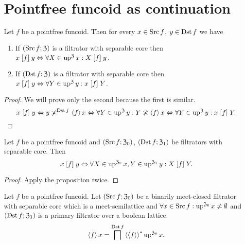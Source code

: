 \section{Pointfree funcoid as continuation}
\begin{prop}
Let $f$ be a pointfree funcoid. Then for every $x\in\operatorname{Src} f$, $y\in\operatorname{Dst} f$
we have
\begin{enumerate}
\item If $(\operatorname{Src} f;\mathfrak{Z})$ is a filtrator with separable core then
$x\mathrel{\left[f\right]}y\Leftrightarrow\forall X\in\operatorname{up}^{\mathfrak{Z}}x:X\mathrel{\left[f\right]}y$.
\item If $(\operatorname{Dst} f;\mathfrak{Z})$ is a filtrator with separable core then
$x\mathrel{\left[f\right]}y\Leftrightarrow\forall Y\in\operatorname{up}^{\mathfrak{Z}}y:x\mathrel{\left[f\right]}Y$.
\end{enumerate}
\end{prop}
\begin{proof}
We will prove only the second because the first is similar.
\[
x\mathrel{\left[f\right]}y\Leftrightarrow y\not\asymp^{\operatorname{Dst} f}\left\langle f\right\rangle x\Leftrightarrow\forall Y\in\operatorname{up}^{\mathfrak{Z}}y:Y\not\asymp\left\langle f\right\rangle x\Leftrightarrow\forall Y\in\operatorname{up}^{\mathfrak{Z}}y:x\mathrel{\left[f\right]}Y.
\]
\end{proof}
\begin{cor}
\label{pf-relatom-both}Let $f$ be a pointfree funcoid and $(\operatorname{Src} f;\mathfrak{Z}_{0})$,
$(\operatorname{Dst} f;\mathfrak{Z}_{1})$ be filtrators with separable core. Then
\[
x\mathrel{\left[f\right]}y\Leftrightarrow\forall X\in\operatorname{up}^{\mathfrak{Z}_{0}}x,Y\in\operatorname{up}^{\mathfrak{Z}_{1}}y:X\mathrel{\left[f\right]}Y.
\]
\end{cor}
\begin{proof}
Apply the proposition twice.\end{proof}
\begin{thm}
\label{pf-supfun-up}Let $f$ be a pointfree funcoid. Let $(\operatorname{Src} f;\mathfrak{Z}_{0})$
be a binarily meet-closed filtrator with separable core which is a
meet-semilattice and $\forall x\in\operatorname{Src} f:\operatorname{up}^{\mathfrak{Z}_{0}}x\neq\emptyset$
and $(\operatorname{Dst} f;\mathfrak{Z}_{1})$ is a primary filtrator over a boolean
lattice.
\[
\left\langle f\right\rangle x=\bigsqcap^{\operatorname{Dst} f}\left\langle \left\langle f\right\rangle\right\rangle ^{\ast}\operatorname{up}^{\mathfrak{Z}_{0}}x.
\]
\end{thm}

